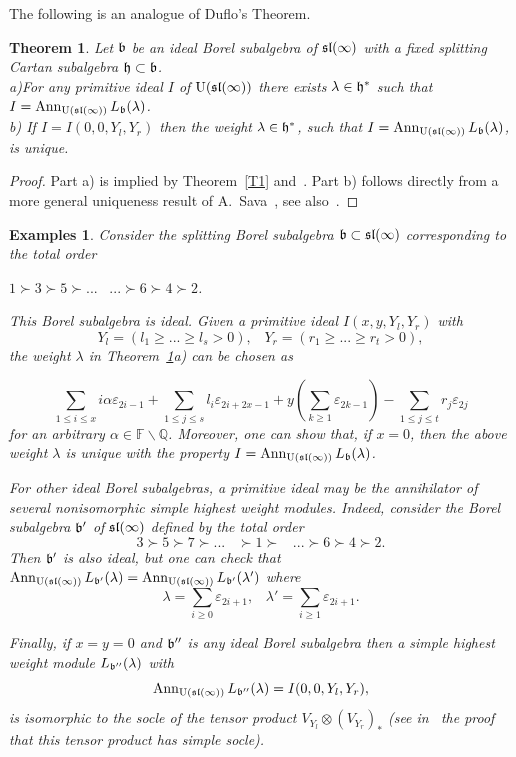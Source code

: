\documentclass[10pt]{amsart}\oddsidemargin -1mm \evensidemargin -1mm \topmargin -15mm\headheight5mm \headsep 3.5mm \textheight 245mm\textwidth 170mm %
\newtheorem{theorem}{Theorem}[section]\newtheorem{lemma}[theorem]{Lemma}\newtheorem{claim}[theorem]{Claim}\newtheorem{remark}[theorem]{Remark}\newtheorem{proposition}[theorem]{Proposition}\newtheorem{corollary}[theorem]{Corollary}\newtheorem{definition}[theorem]{Definition}\newtheorem{Ex}[theorem]{Example}\newtheorem*{Ex0}{Examples}
\begin{document}
The following is an analogue of Duflo's Theorem.
\begin{theorem}\label{T1c}Let $\frak b$ be an ideal Borel subalgebra of $\frak{sl}(\infty)$ with a fixed splitting Cartan subalgebra $\frak h\subset\frak b$.\\
a)For any primitive ideal $I$ of $\operatorname{\mathrm{U}}(\frak{sl}(\infty))$ there exists $\lambda\in\frak h^*$ such that $I=\operatorname{\mathrm{Ann}}_{\operatorname{\mathrm{U}}(\frak{sl}(\infty))}L_\frak b(\lambda)$.\\
b) If $I=I(0, 0, Y_l, Y_r)$ then the weight $\lambda\in\frak h^*$, such that $I=\operatorname{\mathrm{Ann}}_{\operatorname{\mathrm{U}}(\frak{sl}(\infty))}L_\frak b(\lambda)$, is unique.
\end{theorem}
\begin{proof}Part a) is implied by Theorem~\ref{T1} and~\cite[Theorem 3.1]{PP2}. Part b) follows directly from a more general uniqueness result of A.~Sava~\cite{S}, see also~\cite{PP3}.\end{proof}
\begin{Ex0}
Consider the splitting Borel subalgebra $\frak b\subset\frak{sl}(\infty)$ corresponding to the total order\begin{center}$1\succ3\succ5\succ...\hspace{10pt}...\succ6\succ4\succ2$.\end{center}
This Borel subalgebra is ideal. Given a primitive ideal $I(x, y, Y_l, Y_r)$ with $$Y_l=( l_1\ge ...\ge l_s>0),\hspace{10pt}Y_r=(r_1\ge ...\ge r_t>0),$$ the weight $\lambda$ in Theorem~\ref{T1c}a) can be chosen as

$$\sum\limits_{1\le i\le x}i\alpha\varepsilon_{2i-1}+\sum_{1\le j\le s}l_i\varepsilon_{2i+2x-1}+y(\sum_{k\ge1}\varepsilon_{2k-1})-\sum_{1\le j\le t}r_{j}\varepsilon_{2j}$$
for an arbitrary $\alpha\in\mathbb F\backslash\mathbb Q$. Moreover, one  can show that, if $x=0$, then the above weight $\lambda$ is unique with the property $I=\operatorname{\mathrm{Ann}}_{\operatorname{\mathrm{U}}(\frak{sl}(\infty))}L_\frak b(\lambda)$.

For other ideal Borel subalgebras, a primitive ideal may be the annihilator of several nonisomorphic simple highest weight modules. 
Indeed, consider the Borel subalgebra $\frak b'$ of $\frak{sl}(\infty)$ defined by the total order
$$3\succ5\succ7\succ...\hspace{10pt}\succ1\succ\hspace{10pt}...\succ 6\succ4\succ 2.$$
Then $\frak b'$ is also ideal, but one can check that $\operatorname{\mathrm{Ann}}_{\operatorname{\mathrm{U}}(\frak{sl}(\infty))}L_{\frak b'}(\lambda)=\operatorname{\mathrm{Ann}}_{\operatorname{\mathrm{U}}(\frak{sl}(\infty))}L_{\frak b'}(\lambda')$ where
$$\lambda=\sum\limits_{i\ge0}\varepsilon_{2i+1},\hspace{10pt}\lambda'=\sum\limits_{i\ge1}\varepsilon_{2i+1}.$$

Finally, if $x=y=0$ and $\frak b''$ is any ideal Borel subalgebra then a simple highest weight module $L_{\frak b''}(\lambda)$ with
$$\operatorname{\mathrm{Ann}}_{\operatorname{\mathrm{U}}(\frak{sl}(\infty))} L_{\frak b''}(\lambda)=I(0, 0, Y_l, Y_r),$$ is isomorphic to the socle of the tensor product $V_{Y_l}\otimes (V_{Y_r})_*$ (see in~\cite{PSt} the proof that this tensor product has simple socle).\end{Ex0}
\end{document}
